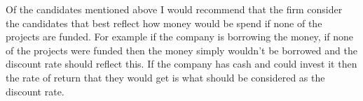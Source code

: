\documentclass[letterpaper, reqno,11pt]{article}
\begin{document}
Of the candidates mentioned above I would recommend that the firm consider the candidates that best reflect how money would be spend if none of the projects are funded. For example if the company is borrowing the money, if none of the projects were funded then the money simply wouldn't be borrowed and the discount rate should reflect this. If the company has cash and could invest it then the rate of return that they would get is what should be considered as the discount rate. 
\end{document}
